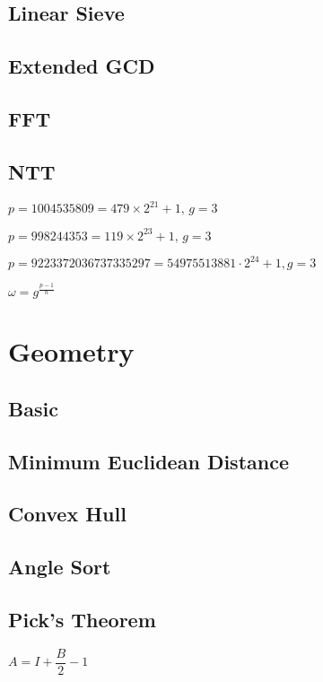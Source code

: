 \documentclass[10pt,a4paper,twocolumn,oneside]{article}
\begin{document}
		\subsection{Linear Sieve}
			
		\subsection{Extended GCD}
			
		\subsection{FFT}
			
		\subsection{NTT}
			$p = 1004535809 = 479 \times 2^{21} + 1,\,g = 3$\par
			$p = 998244353 = 119 \times 2^{23} + 1,\,g = 3$\par
			$p = 9223372036737335297 = 54975513881 \cdot 2^{24} + 1, g = 3$\par
			$\omega = g^{\frac{p-1}{n}}$
	\section{Geometry}
		\subsection{Basic}
			
		\subsection{Minimum Euclidean Distance}
			
		\subsection{Convex Hull}
			
		\subsection{Angle Sort}
			
		\subsection{Pick's Theorem}
			$A = I + \dfrac B 2 - 1$
\end{document}
